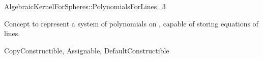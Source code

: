 \begin{ccRefConcept}{AlgebraicKernelForSpheres::PolynomialsForLines_3}

\ccDefinition

Concept to represent a system of polynomials on ,
capable of storing equations of lines. 

\ccRefines
CopyConstructible, Assignable, DefaultConstructible






\ccHasModels


\ccSeeAlso


\end{ccRefConcept}
